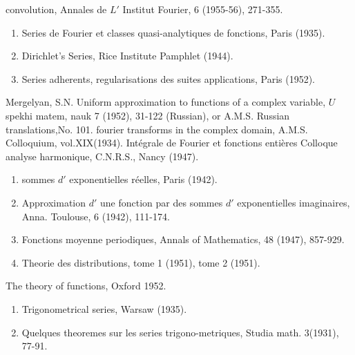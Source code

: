 \begin{thebibliography}{99}
 convolution, Annales de $L'$ Institut Fourier, 6 (1955-56),
 271-355. 
 \begin{enumerate}
 \item Series de Fourier et classes quasi-analytiques de fonctions, Paris (1935).
 \item Dirichlet's Series, Rice Institute Pamphlet (1944).
 \item Series adherents, regularisations des suites applications, Paris (1952).
 \end{enumerate}
 {Mergelyan, S.N.} Uniform approximation to functions of a
 complex variable, $U$ spekhi matem, nauk 7 (1952), 31-122
 (Russian), or A.M.S. Russian translations,No. 101. 
 fourier transforms in the
 complex domain, A.M.S. Colloquium, vol.XIX(1934). 
 Int\'egrale de Fourier et fonctions enti\`eres
 Colloque analyse harmonique, C.N.R.S., Nancy (1947). 
 \begin{enumerate}
 \item sommes $d'$ exponentielles r\'eelles, Paris (1942).
 \item Approximation $d'$ une fonction par des sommes $d'$
 exponentielles imaginaires, Anna. Toulouse, 6 (1942), 111-174. 
 \item Fonctions moyenne periodiques, Annals of Mathematics, 48 (1947), 857-929.
 \item Theorie des distributions, tome 1 (1951), tome 2 (1951).
 \end{enumerate}
 The theory of functions, Oxford 1952.
 \begin{enumerate}
 \item Trigonometrical series, Warsaw (1935).
 \item Quelques theoremes sur les series trigono-metriques, Studia
 math. 3(1931), 77-91. 
 \end{enumerate}
\end{thebibliography}

